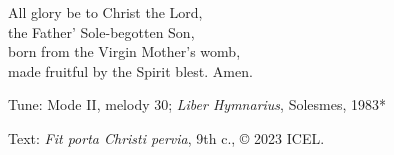 \hymn



\begin{underhymnverse}
All glory be to Christ the Lord,\\
the Father’ Sole-begotten Son,\\
born from the Virgin Mother’s womb,\\
made fruitful by the Spirit blest. Amen.
\end{underhymnverse}

\begin{hymnsource}
Tune: Mode II, melody 30; \emph{Liber Hymnarius}, Solesmes, 1983*

Text: \emph{Fit porta Christi pervia}, 9th c., © 2023 ICEL.
\end{hymnsource}
